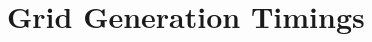 \documentclass[xcolor=rgb,svgnames,dvipsnames]{article}
\begin{document}
\vfill\eject


\clearpage
\section{Grid Generation Timings}


\newcommand{\maxNorm}[1]{\vert\vert #1 \vert\vert_\infty}
\newcommand{\maxRes}{\maxNorm{\mbox{res}}}
\end{document}
